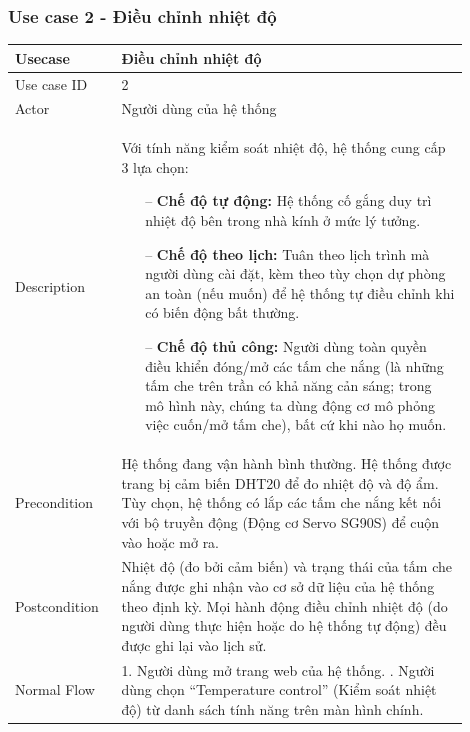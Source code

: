 \subsubsection{Use case 2 - Điều chỉnh nhiệt độ}
\renewcommand{\arraystretch}{1.6}
\begin{table}[H]
\centering
\begin{tabular}{|p{0.2\linewidth}|p{0.7\linewidth}|}
\hline
\rowcolor[HTML]{EFEFEF} 
\textbf{Usecase}        & \textbf{Điều chỉnh nhiệt độ} \\ \hline
Use case ID             & 2 \\ \hline
Actor                   & Người dùng của hệ thống \\ \hline
Description             & 
    Với tính năng kiểm soát nhiệt độ, hệ thống cung cấp 3 lựa chọn:
    \begin{itemize}
        \item [--] \textbf{Chế độ tự động:} Hệ thống cố gắng duy trì nhiệt độ bên trong nhà kính ở mức lý tưởng.
        \item [--] \textbf{Chế độ theo lịch:} Tuân theo lịch trình mà người dùng cài đặt, kèm theo tùy chọn dự phòng an toàn (nếu muốn) để hệ thống tự điều chỉnh khi có biến động bất thường.
        \item [--] \textbf{Chế độ thủ công:} Người dùng toàn quyền điều khiển đóng/mở các tấm che nắng (là những tấm che trên trần có khả năng cản sáng; trong mô hình này, chúng ta dùng động cơ mô phỏng việc cuốn/mở tấm che), bất cứ khi nào họ muốn.
    \end{itemize}
\\ \hline
Precondition            & 
Hệ thống đang vận hành bình thường. \newline
Hệ thống được trang bị cảm biến DHT20 để đo nhiệt độ và độ ẩm. \newline
Tùy chọn, hệ thống có lắp các tấm che nắng kết nối với bộ truyền động (Động cơ Servo SG90S) để cuộn vào hoặc mở ra. 
\\ \hline
Postcondition           & 
Nhiệt độ (đo bởi cảm biến) và trạng thái của tấm che nắng được ghi nhận vào cơ sở dữ liệu của hệ thống theo định kỳ. \newline
Mọi hành động điều chỉnh nhiệt độ (do người dùng thực hiện hoặc do hệ thống tự động) đều được ghi lại vào lịch sử.
\\ \hline
Normal Flow             & 
1. Người dùng mở trang web của hệ thống. \newline
2. Người dùng chọn “Temperature control” (Kiểm soát nhiệt độ) từ danh sách tính năng trên màn hình chính. \newline

\end{tabular}
\end{table}
